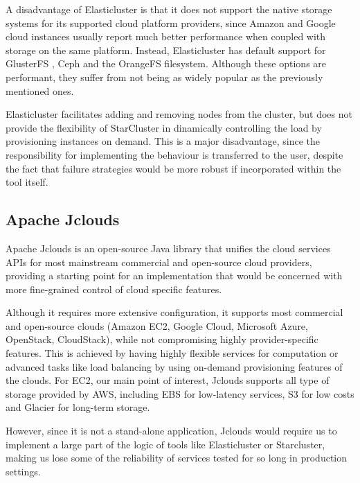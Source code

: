 A disadvantage of Elasticluster is that it does not support the native storage systems for its supported cloud platform providers, since Amazon and Google cloud instances usually report much better performance when coupled with storage on the same platform. Instead, Elasticluster has default support for GlusterFS \cite{GlusterFS}, Ceph \cite{Ceph} and the OrangeFS \cite{OrangeFS} filesystem. Although these options are performant, they suffer from not being as widely popular as the previously mentioned ones.

Elasticluster facilitates adding and removing nodes from the cluster, but does not provide the flexibility of StarCluster in dinamically controlling the load by provisioning instances on demand. This is a major disadvantage, since the responsibility for implementing the behaviour is transferred to the user, despite the fact that failure strategies would be more robust if incorporated within the tool itself.

\subsection{Apache Jclouds}

Apache Jclouds \cite{jclouds} is an open-source Java library that unifies the cloud services APIs for most mainstream commercial and open-source cloud providers, providing a starting point for an implementation that would be concerned with more fine-grained control of cloud specific features.

Although it requires more extensive configuration, it supports most commercial and open-source clouds (Amazon EC2, Google Cloud, Microsoft Azure, OpenStack, CloudStack), while not compromising highly provider-specific features. This is achieved by having highly flexible services for computation or advanced tasks like load balancing by using on-demand provisioning features of the clouds. For EC2, our main point of interest, Jclouds supports all type of storage provided by AWS, including EBS for low-latency services, S3 for low costs and Glacier for long-term storage.

However, since it is not a stand-alone application, Jclouds would require us to implement a large part of the logic of tools like Elasticluster or Starcluster, making us lose some of the reliability of services tested for so long in production settings.



